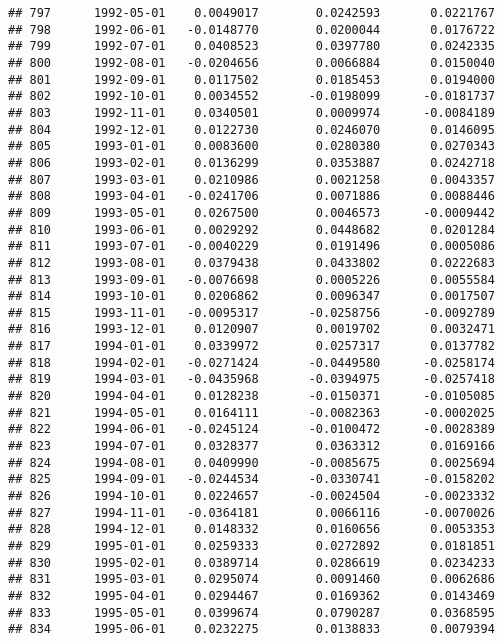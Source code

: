 \documentclass[
]{article}
\begin{document}
\begin{verbatim}
## 797      1992-05-01    0.0049017        0.0242593       0.0221767
## 798      1992-06-01   -0.0148770        0.0200044       0.0176722
## 799      1992-07-01    0.0408523        0.0397780       0.0242335
## 800      1992-08-01   -0.0204656        0.0066884       0.0150040
## 801      1992-09-01    0.0117502        0.0185453       0.0194000
## 802      1992-10-01    0.0034552       -0.0198099      -0.0181737
## 803      1992-11-01    0.0340501        0.0009974      -0.0084189
## 804      1992-12-01    0.0122730        0.0246070       0.0146095
## 805      1993-01-01    0.0083600        0.0280380       0.0270343
## 806      1993-02-01    0.0136299        0.0353887       0.0242718
## 807      1993-03-01    0.0210986        0.0021258       0.0043357
## 808      1993-04-01   -0.0241706        0.0071886       0.0088446
## 809      1993-05-01    0.0267500        0.0046573      -0.0009442
## 810      1993-06-01    0.0029292        0.0448682       0.0201284
## 811      1993-07-01   -0.0040229        0.0191496       0.0005086
## 812      1993-08-01    0.0379438        0.0433802       0.0222683
## 813      1993-09-01   -0.0076698        0.0005226       0.0055584
## 814      1993-10-01    0.0206862        0.0096347       0.0017507
## 815      1993-11-01   -0.0095317       -0.0258756      -0.0092789
## 816      1993-12-01    0.0120907        0.0019702       0.0032471
## 817      1994-01-01    0.0339972        0.0257317       0.0137782
## 818      1994-02-01   -0.0271424       -0.0449580      -0.0258174
## 819      1994-03-01   -0.0435968       -0.0394975      -0.0257418
## 820      1994-04-01    0.0128238       -0.0150371      -0.0105085
## 821      1994-05-01    0.0164111       -0.0082363      -0.0002025
## 822      1994-06-01   -0.0245124       -0.0100472      -0.0028389
## 823      1994-07-01    0.0328377        0.0363312       0.0169166
## 824      1994-08-01    0.0409990       -0.0085675       0.0025694
## 825      1994-09-01   -0.0244534       -0.0330741      -0.0158202
## 826      1994-10-01    0.0224657       -0.0024504      -0.0023332
## 827      1994-11-01   -0.0364181        0.0066116      -0.0070026
## 828      1994-12-01    0.0148332        0.0160656       0.0053353
## 829      1995-01-01    0.0259333        0.0272892       0.0181851
## 830      1995-02-01    0.0389714        0.0286619       0.0234233
## 831      1995-03-01    0.0295074        0.0091460       0.0062686
## 832      1995-04-01    0.0294467        0.0169362       0.0143469
## 833      1995-05-01    0.0399674        0.0790287       0.0368595
## 834      1995-06-01    0.0232275        0.0138833       0.0079394

\end{verbatim}
\end{document}
